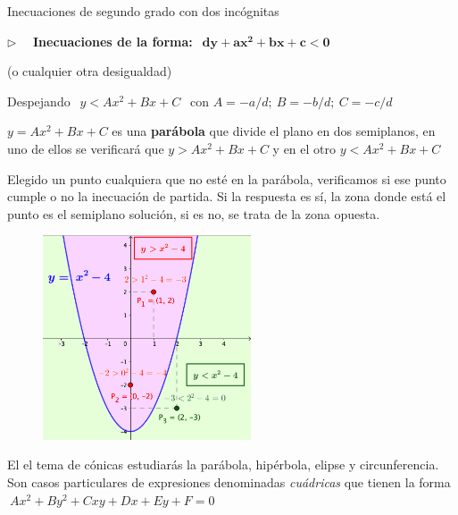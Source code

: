 \begin{myalertblock}{Inecuaciones de segundo grado con dos incógnitas}

\vspace{5mm}
	$\triangleright \quad $ \textbf{Inecuaciones de la forma:} $\ \ \boldsymbol {dy+ax^2+bx+c<0}\ \ $  \begin{footnotesize}(o cualquier otra desigualdad)\end{footnotesize}
	
\vspace{2mm} Despejando $\ \ y<Ax^2+Bx+C\ \ $ \textcolor{gris}{con $A=-a/d;\ B=-b/d;\ C=-c/d$ }

\vspace{2mm} $y=Ax^2+Bx+C$ es una \textbf{parábola} que divide el plano en dos semiplanos, en uno de ellos se verificará que $y>Ax^2+Bx+C$ y en el otro $y<Ax^2+Bx+C$

\vspace{2mm} Elegido un punto cualquiera que no esté en la parábola,   verificamos si ese punto cumple o no la inecuación de partida. Si la respuesta es sí, la zona donde está el punto es el semiplano solución, si es no, se trata de la zona opuesta.	

\vspace{5mm}

\begin{figure}[H]
		\centering
		\includegraphics[width=0.55\textwidth]{img-ecc/ecc15.png}
	\end{figure}


\vspace{5mm} El el tema de cónicas estudiarás la parábola, hipérbola, elipse y circunferencia. Son casos particulares de expresiones denominadas \emph{cuádricas} que tienen la forma $\ Ax^2 + By^2 + Cxy + Dx + Ey  + F = 0 $


\end{myalertblock}



